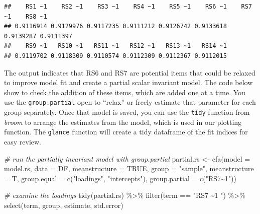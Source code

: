 \documentclass[
  man]{apa7}
\newenvironment{Shaded}{\begin{snugshade}}{\end{snugshade}}
\newcommand{\AttributeTok}[1]{\textcolor[rgb]{0.77,0.63,0.00}{#1}}
\newcommand{\CommentTok}[1]{\textcolor[rgb]{0.56,0.35,0.01}{\textit{#1}}}
\newcommand{\ConstantTok}[1]{\textcolor[rgb]{0.00,0.00,0.00}{#1}}
\newcommand{\FunctionTok}[1]{\textcolor[rgb]{0.00,0.00,0.00}{#1}}
\newcommand{\NormalTok}[1]{#1}
\newcommand{\OtherTok}[1]{\textcolor[rgb]{0.56,0.35,0.01}{#1}}
\newcommand{\SpecialCharTok}[1]{\textcolor[rgb]{0.00,0.00,0.00}{#1}}
\newcommand{\StringTok}[1]{\textcolor[rgb]{0.31,0.60,0.02}{#1}}
\begin{document}
\normalsize

\begin{verbatim}
##    RS1 ~1    RS2 ~1    RS3 ~1    RS4 ~1    RS5 ~1    RS6 ~1    RS7 ~1    RS8 ~1 
## 0.9116914 0.9129976 0.9117235 0.9111212 0.9126742 0.9133618 0.9139287 0.9111397 
##    RS9 ~1   RS10 ~1   RS11 ~1   RS12 ~1   RS13 ~1   RS14 ~1 
## 0.9119702 0.9118309 0.9110574 0.9112309 0.9112367 0.9112015
\end{verbatim}

The output indicates that RS6 and RS7 are potential items that could be relaxed to improve model fit and create a partial scalar invariant model. The code below show to check the addition of these items, which are added one at a time. You use the \texttt{group.partial} open to ``relax'' or freely estimate that parameter for each group separately. Once that model is saved, you can use the \texttt{tidy} function from \emph{broom} to arrange the estimates from the model, which is used in our plotting function. The \texttt{glance} function will create a tidy dataframe of the fit indices for easy review.

\small

\begin{Shaded}
\begin{Highlighting}[]
\CommentTok{\# run the partially invariant model with group.partial}
\NormalTok{partial.rs }\OtherTok{\textless{}{-}} \FunctionTok{cfa}\NormalTok{(}\AttributeTok{model =}\NormalTok{ model.rs, }
                  \AttributeTok{data =}\NormalTok{ DF, }
                  \AttributeTok{meanstructure =} \ConstantTok{TRUE}\NormalTok{,}
                  \AttributeTok{group =} \StringTok{"sample"}\NormalTok{, }
                  \AttributeTok{meanstructure =}\NormalTok{ T, }
                  \AttributeTok{group.equal =} \FunctionTok{c}\NormalTok{(}\StringTok{"loadings"}\NormalTok{, }\StringTok{"intercepts"}\NormalTok{),}
                  \AttributeTok{group.partial =} \FunctionTok{c}\NormalTok{(}\StringTok{"RS7\textasciitilde{}1"}\NormalTok{))}

\CommentTok{\# examine the loadings }
\FunctionTok{tidy}\NormalTok{(partial.rs) }\SpecialCharTok{\%\textgreater{}\%} 
  \FunctionTok{filter}\NormalTok{(term }\SpecialCharTok{==} \StringTok{"RS7 \textasciitilde{}1 "}\NormalTok{) }\SpecialCharTok{\%\textgreater{}\%} 
  \FunctionTok{select}\NormalTok{(term, group, estimate, std.error)}
\end{Highlighting}
\end{Shaded}

\normalsize
\end{document}
